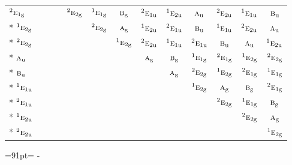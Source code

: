 \documentclass[10pt,a4paper]{article}
\newcommand{\needspace}[1]{\par\penalty-100\begingroup\dimen0=#1\relax\dimen2=\pagegoal
  \advance\dimen2-\pagetotal\ifdim\dimen0>\dimen2\relax\ifdim\dimen2>0pt\vfil\break\fi\fi
  \endgroup}
\numberwithin{equation}{section}
\newcommand{\irr}[1]{\text{\normalfont\scshape #1}}
\newcommand{\conjpair}[1]{{}^{#1}}
\newcommand{\ptag}[1]{\mathrm{#1}}
\begin{document}
{\begin{longtable}{@{}lcccccccccccc@{}}
$\conjpair{2}\irr{e}_{1\ptag{g}}$ &  &  &  & $\conjpair{2}\irr{e}_{2\ptag{g}}$ & $\conjpair{1}\irr{e}_{1\ptag{g}}$ & $\irr{b}_{\ptag{g}}$ & $\conjpair{2}\irr{e}_{1\ptag{u}}$ & $\conjpair{1}\irr{e}_{2\ptag{u}}$ & $\irr{a}_{\ptag{u}}$ & $\conjpair{2}\irr{e}_{2\ptag{u}}$ & $\conjpair{1}\irr{e}_{1\ptag{u}}$ & $\irr{b}_{\ptag{u}}$\\*
$\conjpair{1}\irr{e}_{2\ptag{g}}$ &  &  &  &  & $\conjpair{2}\irr{e}_{2\ptag{g}}$ & $\irr{a}_{\ptag{g}}$ & $\conjpair{1}\irr{e}_{2\ptag{u}}$ & $\conjpair{2}\irr{e}_{1\ptag{u}}$ & $\irr{b}_{\ptag{u}}$ & $\conjpair{1}\irr{e}_{1\ptag{u}}$ & $\conjpair{2}\irr{e}_{2\ptag{u}}$ & $\irr{a}_{\ptag{u}}$\\*
$\conjpair{2}\irr{e}_{2\ptag{g}}$ &  &  &  &  &  & $\conjpair{1}\irr{e}_{2\ptag{g}}$ & $\conjpair{2}\irr{e}_{2\ptag{u}}$ & $\conjpair{1}\irr{e}_{1\ptag{u}}$ & $\conjpair{2}\irr{e}_{1\ptag{u}}$ & $\irr{b}_{\ptag{u}}$ & $\irr{a}_{\ptag{u}}$ & $\conjpair{1}\irr{e}_{2\ptag{u}}$\\*
$\irr{a}_{\ptag{u}}$ &  &  &  &  &  &  & $\irr{a}_{\ptag{g}}$ & $\irr{b}_{\ptag{g}}$ & $\conjpair{1}\irr{e}_{1\ptag{g}}$ & $\conjpair{2}\irr{e}_{1\ptag{g}}$ & $\conjpair{1}\irr{e}_{2\ptag{g}}$ & $\conjpair{2}\irr{e}_{2\ptag{g}}$\\*
$\irr{b}_{\ptag{u}}$ &  &  &  &  &  &  &  & $\irr{a}_{\ptag{g}}$ & $\conjpair{2}\irr{e}_{2\ptag{g}}$ & $\conjpair{1}\irr{e}_{2\ptag{g}}$ & $\conjpair{2}\irr{e}_{1\ptag{g}}$ & $\conjpair{1}\irr{e}_{1\ptag{g}}$\\*
$\conjpair{1}\irr{e}_{1\ptag{u}}$ &  &  &  &  &  &  &  &  & $\conjpair{1}\irr{e}_{2\ptag{g}}$ & $\irr{a}_{\ptag{g}}$ & $\irr{b}_{\ptag{g}}$ & $\conjpair{2}\irr{e}_{1\ptag{g}}$\\*
$\conjpair{2}\irr{e}_{1\ptag{u}}$ &  &  &  &  &  &  &  &  &  & $\conjpair{2}\irr{e}_{2\ptag{g}}$ & $\conjpair{1}\irr{e}_{1\ptag{g}}$ & $\irr{b}_{\ptag{g}}$\\*
$\conjpair{1}\irr{e}_{2\ptag{u}}$ &  &  &  &  &  &  &  &  &  &  & $\conjpair{2}\irr{e}_{2\ptag{g}}$ & $\irr{a}_{\ptag{g}}$\\*
$\conjpair{2}\irr{e}_{2\ptag{u}}$ &  &  &  &  &  &  &  &  &  &  &  & $\conjpair{1}\irr{e}_{2\ptag{g}}$\\
\bottomrule\end{longtable}}
\needspace{91pt}
\end{document}
